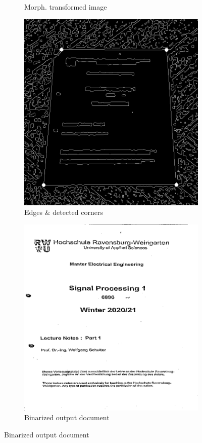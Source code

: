 \documentclass{scrartcl}
\begin{document}
\begin{figure}[!htbp]
\begin{subfigure}[b]{0.3\textwidth}
      \caption{Morph. transformed image}
    \end{subfigure}
    \begin{subfigure}[b]{0.3\textwidth}
      \centering
      \includegraphics[width=\textwidth]{pictures/results/wood1/edge-detector.png}
      \caption{Edges \& detected corners}
    \end{subfigure}
    \begin{subfigure}[b]{0.3\textwidth}
      \centering
      \includegraphics[width=\textwidth]{pictures/results/wood1/document.png}
      \caption{Binarized output document}
    \end{subfigure}


\end{figure}
\end{document}
